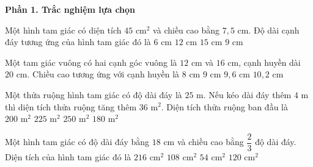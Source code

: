 \textbf{Phần 1. Trắc nghiệm lựa chọn}

\begin{ex} %
Một hình tam giác có diện tích $45\text{ cm}^2$ và chiều cao bằng $7{,}5\text{ cm}$. Độ dài cạnh đáy tương ứng của hình tam giác đó là
\choice
{$6\text{ cm}$}
{\True $12\text{ cm}$}
{$15\text{ cm}$}
{$9\text{ cm}$}
\end{ex}

\begin{ex} %
Một tam giác vuông có hai cạnh góc vuông là $12\text{ cm}$ và $16\text{ cm}$, cạnh huyền dài $20\text{ cm}$. Chiều cao tương ứng với cạnh huyền là
\choice
{$8\text{ cm}$}
{$9\text{ cm}$}
{\True $9{,}6\text{ cm}$}
{$10{,}2\text{ cm}$}
\end{ex}

\begin{ex} %
Một thửa ruộng hình tam giác có độ dài đáy là $25\text{ m}$. Nếu kéo dài đáy thêm $4\text{ m}$ thì diện tích thửa ruộng tăng thêm $36\text{ m}^2$. Diện tích thửa ruộng ban đầu là
\choice
{$200\text{ m}^2$}
{\True $225\text{ m}^2$}
{$250\text{ m}^2$}
{$180\text{ m}^2$}
\end{ex}

\begin{ex} %
Một hình tam giác có độ dài đáy bằng $18\text{ cm}$ và chiều cao bằng $\dfrac{2}{3}$ độ dài đáy. Diện tích của hình tam giác đó là
\choice
{$216\text{ cm}^2$}
{\True $108\text{ cm}^2$}
{$54\text{ cm}^2$}
{$120\text{ cm}^2$}
\end{ex}

